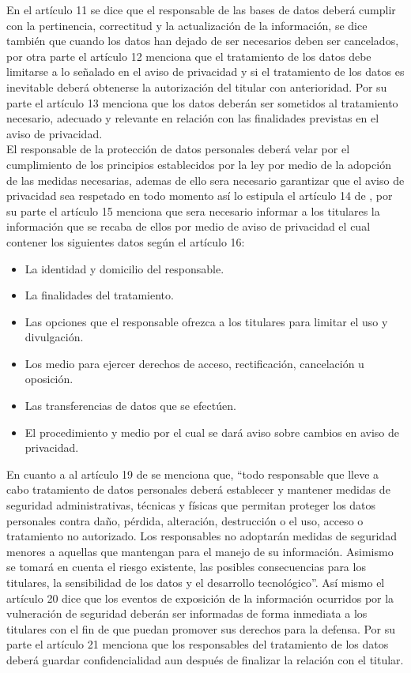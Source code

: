 \documentclass[runningheads,a4paper]{llncs}
\begin{document}
En el artículo 11 se dice que el responsable de las bases de datos deberá cumplir con la pertinencia, correctitud y la actualización de la información, se dice también que cuando los datos han dejado de ser necesarios deben ser cancelados, por otra parte el artículo 12 menciona que el tratamiento de los datos debe limitarse a lo señalado en el aviso de privacidad y si el tratamiento de los datos es inevitable deberá obtenerse la autorización del titular con anterioridad. Por su parte el artículo 13 menciona que los datos deberán ser sometidos al tratamiento necesario, adecuado y relevante en relación con las finalidades previstas en el aviso de privacidad.\\    

El responsable de la protección de datos personales deberá velar por el cumplimiento de los principios establecidos por la ley por medio de la adopción de las medidas necesarias, ademas de ello sera necesario garantizar que el aviso de privacidad sea respetado en todo momento así lo estipula el artículo 14 de \cite{LFPDPPP_1}, por su parte el artículo 15 menciona que sera necesario informar a los titulares la información que se recaba de ellos por medio de aviso de privacidad el cual contener los siguientes datos según el artículo 16: 

\begin{itemize}
	\item La identidad y domicilio del responsable.
	\item La finalidades del tratamiento.
	\item Las opciones que el responsable ofrezca a los titulares para limitar el uso y divulgación.
	\item Los medio para ejercer derechos de acceso, rectificación, cancelación u oposición.
	\item Las transferencias de datos que se efectúen.
	\item El procedimiento y medio por el cual se dará aviso sobre cambios en aviso de privacidad.
\end{itemize}

En cuanto a al artículo 19 de \cite{LFPDPPP_1} se menciona que, ``todo responsable que lleve a cabo tratamiento de datos personales deberá establecer y mantener medidas de seguridad administrativas, técnicas y físicas que permitan proteger los datos personales contra daño, pérdida, alteración, destrucción o el uso, acceso o tratamiento no autorizado. Los responsables no adoptarán medidas de seguridad menores a aquellas que mantengan para el manejo de su información. Asimismo se tomará en cuenta el riesgo existente, las posibles consecuencias para los titulares, la sensibilidad de los datos y el desarrollo tecnológico''. Así mismo el artículo 20 dice que los eventos de exposición de la información ocurridos por la vulneración de seguridad deberán ser informadas de forma inmediata a los titulares con el fin de que puedan promover sus derechos para la defensa. Por su parte el artículo 21 menciona que los responsables del tratamiento de los datos deberá guardar confidencialidad aun después de finalizar la relación con el titular. \\
\end{document}
